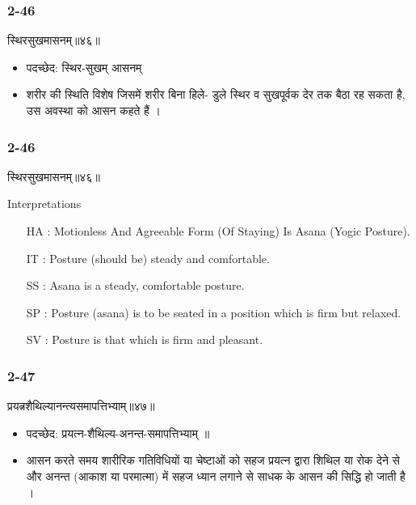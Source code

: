 \begin{frame}[fragile]\frametitle{2-46}
\begin{sanskrit}
स्थिरसुखमासनम्॥४६॥
\end{sanskrit}

\begin{itemize}
\item पदच्छेद: स्थिर-सुखम् आसनम्
\item शरीर की स्थिति विशेष जिसमें शरीर बिना हिले- डुले स्थिर व सुखपूर्वक देर तक बैठा रह सकता है, उस अवस्था को आसन कहते हैं ।
\end{itemize}	
\end{frame}



\begin{frame}[fragile]\frametitle{2-46}
\begin{sanskrit}
स्थिरसुखमासनम्॥४६॥
\end{sanskrit}

Interpretations
\begin{itemize}
\item [HA]: Motionless And Agreeable Form (Of Staying) Is Asana (Yogic Posture).
\item [IT]: Posture (should be) steady and comfortable.
\item [SS]: Asana is a steady, comfortable posture.
\item [SP]: Posture (asana) is to be seated in a position which is firm but relaxed.
\item [SV]: Posture is that which is firm and pleasant. 
\end{itemize}
\end{frame}

\begin{frame}[fragile]\frametitle{2-47}
\begin{sanskrit}
प्रयत्नशैथिल्यानन्त्यसमापत्तिभ्याम्॥४७॥
\end{sanskrit}

\begin{itemize}
\item पदच्छेद: प्रयत्न-शैथिल्य-अनन्त-समापत्तिभ्याम् ॥
\item आसन करते समय शारीरिक गतिविधियों या चेष्टाओं को सहज प्रयत्न द्वारा शिथिल या रोक देने से और अनन्त (आकाश या परमात्मा) में सहज ध्यान लगाने से साधक के आसन की सिद्धि हो जाती है ।
\end{itemize}	
	
\end{frame}



